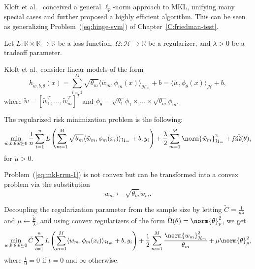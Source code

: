 Kloft et al.\ \cite{kloft2011lp} conceived a general $\ell_p$-norm approach
to MKL, unifying many special cases and further proposed a highly efficient
algorithm.  This can be seen as generalizing Problem~(\ref{eq:hinge-svm})
of Chapter~\ref{C:friedman-test}.

Let $L: \mathbb{R} \times \mathbb{R} \to \mathbb{R}$ be a loss function,
$\Omega : \mathcal{H} \to \mathbb{R}$ be a regularizer, and $\lambda > 0$
be a tradeoff parameter.

Kloft et al.\ consider linear models of the form
\begin{equation*}
  h_{\tilde{w},b,\theta}(x) = \sum_{i=1}^M \sqrt{\theta_m} \langle \tilde{w}_m, \phi_m (x) \rangle_{\mathcal{H}_m} + b
  = \langle \tilde{w}, \phi_{\theta}(x) \rangle_{\mathcal{H}} + b,
\end{equation*}
where $\tilde{w} = [\tilde{w}_1^T,\ldots,\tilde{w}_m^T]^T$ and
$\phi_{\theta} = \sqrt{\theta_1} \phi_1 \times \ldots \times \sqrt{\theta_m} \phi_m$.

The regularized risk minimization problem is the following:
\begin{equation}
  \label{eq:mkl-rrm-1}
  \min_{\tilde{w}, b, \theta : \theta \succeq 0} \frac{1}{n} \sum_{i=1}^n L \left (
  \sum_{m=1}^M \sqrt{\theta_m} \langle \tilde{w}_m, \phi_m(x_i) \rangle_{\mathcal{H}_m} + b, y_i
  \right) + \frac{\lambda}{2}\sum_{m=1}^M \norm{\tilde{w}_m}_{\mathcal{H}_m}^2 +
  \tilde{\mu} \tilde{\Omega}(\theta),
\end{equation}
for $\tilde{\mu} > 0$.

Problem~(\ref{eq:mkl-rrm-1}) is not convex but can be transformed into a convex
problem via the substitution
\begin{equation*}
  w_m \leftarrow \sqrt{\theta_m} \tilde{w}_m.
\end{equation*}

Decoupling the regularization parameter from the sample size by letting
$\tilde{C} = \frac{1}{n \lambda}$ and $\mu \leftarrow \frac{\tilde{\mu}}{\lambda}$,
and using convex regularizers of the form $\tilde{\Omega}(\theta) = \norm{\theta}_p^2$,
we get
\begin{equation}
  \label{eq:mkl-rrm-2}
  \min_{w, b, \theta : \theta \succeq 0} \tilde{C} \sum_{i=1}^n L \left (
  \sum_{m=1}^M \langle w_m, \phi_m(x_i) \rangle_{\mathcal{H}_m} + b, y_i
  \right) + \frac{1}{2} \sum_{m=1}^M \frac{\norm{w_m}_{\mathcal{H}_m}^2}{\theta_m} +
  \mu\norm{\theta}_p^2,
\end{equation}
where $\frac{t}{0} = 0$ if $t=0$ and $\infty$ otherwise.

